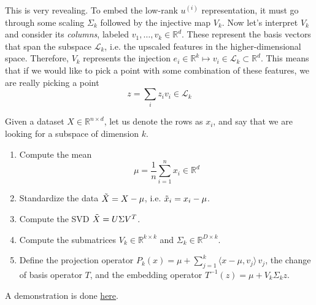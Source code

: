   This is very revealing. To embed the low-rank $u^{(i)}$ representation, it must go through some scaling $\Sigma_k$ followed by the injective map $V_k$. Now let's interpret $V_k$ and consider its \textit{columns}, labeled $v_1, \ldots, v_k \in \mathbb{R}^d$. These represent the basis vectors that span the subspace $\mathcal{L}_k$, i.e. the upscaled features in the higher-dimensional space. Therefore, $V_k$ represents the injection $e_i \in \mathbb{R}^k \mapsto v_i \in \mathcal{L}_k \subset \mathbb{R}^d$. This means that if we would like to pick a point with some combination of these features, we are really picking a point 
  \begin{equation}
    z = \sum_i z_i v_i \in \mathcal{L}_k
  \end{equation}

  \begin{algo}[Fitting] 
    Given a dataset $X \in \mathbb{R}^{n \times d}$, let us denote the rows as $x_i$, and say that we are looking for a subspace of dimension $k$. 
    \begin{enumerate}
      \item Compute the mean 
      \begin{equation}
        \mu = \frac{1}{n} \sum_{i=1}^n x_i  \in \mathbb{R}^d
      \end{equation} 

      \item Standardize the data $\Tilde{X} = X - \mu$, i.e. $\Tilde{x}_i = x_i - \mu$.  

      \item Compute the SVD $\Tilde{X} = U \Sigma V^T$.

      \item Compute the submatrices $V_k \in \mathbb{R}^{k \times k}$ and $\Sigma_k \in \mathbb{R}^{D \times k}$. 

      \item Define the projection operator $P_k (x) = \mu + \sum_{j=1}^k \langle x - \mu, v_j \rangle \, v_j$, the change of basis operator $T$, and the embedding operator $T^{-1} (z) = \mu + V_k \Sigma_k z$. 
    \end{enumerate} 
    A demonstration is done \href{code/pca.html}{here}.
  \end{algo}


